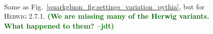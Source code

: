 \documentclass[11pt]{cernrep}
\newcommand{\jdt}[1]{\textbf{\textcolor{darkgreen}{(#1 --jdt)}}}
\begin{document}
\begin{figure}
\centering
{}
$\qquad$
\caption{Same as Fig.~\ref{quarkgluon_fig:settings_variation_pythia}, but for \textsc{Herwig 2.7.1}.  \jdt{We are missing many of the Herwig variants.  What happened to them?}}
\label{quarkgluon_fig:settings_variation_herwig}
\end{figure}
\end{document}
